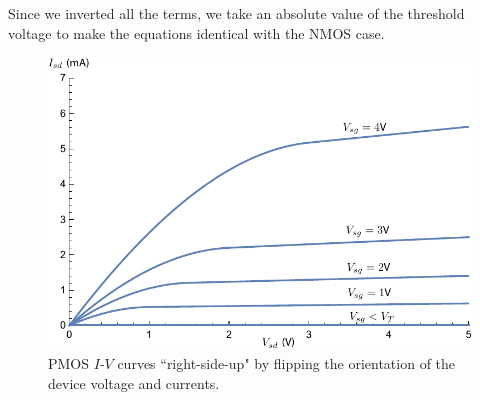 Since we inverted all the terms, we take an absolute value of the threshold voltage to make the equations identical with the NMOS case.  
\begin{figure}[tb]
\centering
\includegraphics[width=.75\columnwidth]{ids_pmos_negative}
\caption{PMOS $I$-$V$ curves ``right-side-up" by flipping the orientation of the device voltage and currents.}
\label{fig:ids_pmos_negative}
\end{figure}
